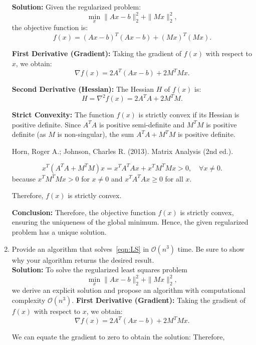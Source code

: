 \documentclass[11pt,onecolumn]{article}
\newcommand{\cO}{\mathcal{O}}
\begin{document}
\begin{enumerate}[label=(\alph*)]
          \textbf{Solution:} Given the regularized problem:
          \[
              \min_x \|Ax - b\|_2^2 + \|Mx\|_2^2,
          \]
          the objective function is:
          \[
              f(x) = (Ax - b)^T(Ax - b) + (Mx)^T(Mx).
          \]

          \textbf{First Derivative (Gradient):}
          Taking the gradient of $f(x)$ with respect to $x$, we obtain:
          \[
              \nabla f(x) = 2A^T(Ax - b) + 2M^TMx.
          \]

          \textbf{Second Derivative (Hessian):}
          The Hessian $H$ of $f(x)$ is:
          \[
              H = \nabla^2 f(x) = 2A^TA + 2M^TM.
          \]

          \textbf{Strict Convexity:}
          The function $f(x)$ is strictly convex if its Hessian is positive definite. Since $A^TA$ is positive semi-definite and $M^TM$ is positive definite (as $M$ is non-singular), the sum $A^TA + M^TM$ is positive definite.

          Horn, Roger A.; Johnson, Charles R. (2013). Matrix Analysis (2nd ed.).

          \[
              x^T(A^TA + M^TM)x = x^TA^TAx + x^TM^TMx > 0, \quad \forall x \neq 0.
          \]
          because $x^TM^T M x > 0$ for $x \neq 0$ and $x^T A^T A x \geq 0$ for all $x$.

          Therefore, $f(x)$ is strictly convex.

          \textbf{Conclusion:}
          Therefore, the objective function $f(x)$ is strictly convex, ensuring the uniqueness of the global minimum. Hence, the given regularized problem has a unique solution.

    \item Provide an algorithm that solves~\eqref{eqn:LS} in $\cO(n^3)$ time. Be sure to show why your algorithm returns the desired result. \\
          \textbf{Solution:}
          To solve the regularized least squares problem
          \[
              \min_x \|Ax - b\|_2^2 + \|Mx\|_2^2,
          \]
          we derive an explicit solution and propose an algorithm with computational complexity $\mathcal{O}(n^3)$.
          \textbf{First Derivative (Gradient):}
          Taking the gradient of $f(x)$ with respect to $x$, we obtain:
          \[
              \nabla f(x) = 2A^T(Ax - b) + 2M^TMx.
          \]

          We can equate the gradient to zero to obtain the solution:
          Therefore,


\end{enumerate}
\end{document}
